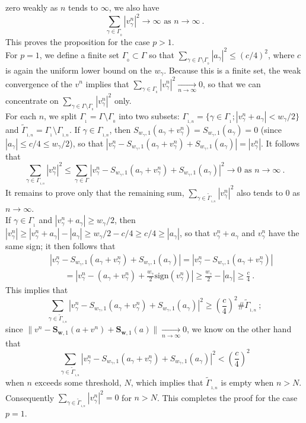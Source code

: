 \documentclass[10pt]{article}
\newcommand{\QED}{\hfill \raisebox{-2pt}{\rule{5.6pt}{8pt}\rule{4pt}{0pt}}%
  \smallskip\par}
\def\S{\mathbf{S}}
\def\ag{w_{\gamma}}
\def\g{\gamma}
\begin{document}
zero weakly as $n$ tends to $\infty$, we also have
$$
\sum_{\g \in \Gamma_{_{\!0}}} |v^n_{\g}|^2 \to \infty \mbox{ as } n \to
\infty ~.
$$
This proves the proposition for the case $p>1$. \\
For $p=1$,
we define  a finite set $\Gamma_{_{\!0}} \subset \Gamma$ so
that $\sum_{ \g \in \Gamma \setminus \Gamma_{_{\!0}}}
|a_{\g}|^2 \leq (c/4 )^2$,
where $c$ is again the uniform lower bound on the $\ag$.
Because this is a finite set, the weak convergence of the $v^n$
implies that $\sum_{\g \in \Gamma_{_{\!0}}} |v^n_{\g}|^2
\xrightarrow[n \to \infty]{~}  0$,
so that we can concentrate on
$\sum_{\g \in \Gamma \setminus \Gamma_{_{\!0}}} |v^n_{\g}|^2$ only. \\
For each $n$, we split $\Gamma_{_{\!1}}=\Gamma \setminus \Gamma_{_{\!0}}$ into
two subsets:
$\Gamma_{_{\!1,n}} = \{\g \in \Gamma_{_{\!1}};
|v^n_{\g}+a_{\g}| <\ag/2\}$ and $\widetilde{\Gamma}_{_{\!1,n}}=
\Gamma_{_{\!1}} \setminus \Gamma_{_{\!1,n}}$. If $\g \in \Gamma_{_{\!1,n}}$,
then $S_{\ag,1}(a_{\g}+v^n_{\g})=
S_{\ag,1}(a_{\g}) =0$ (since $|a_{\g}|\leq c/4 \leq \ag/2$),
so that $|v^n_{\g} -
S_{\ag,1}(a_{\g}+v^n_{\g}) + S_{\ag,1}(a_{\g})|=|v^n_{\g}|$.
It follows that
$$
\sum_{\g \in \Gamma_{_{\!1,n}}} |v^n_{\g}|^2
\leq \sum_{\g \in \Gamma} |v^n_{\g} -
S_{\ag,1}(a_{\g}+v^n_{\g}) + S_{\ag,1}(a_{\g})|^2 \to 0 \mbox{ as }
n \to \infty ~.
$$
It remains to prove only that
the remaining sum, $\sum_{\g \in \widetilde{\Gamma}_{_{\!1,n}}}
|v^n_{\g}|^2 $ also tends
to $0$ as $n \to \infty$.  \\
If $\g \in \Gamma_{_{\!1}}$ and $|v^n_{\g}+a_{\g}| \geq \ag/2$, then
$|v^n_{\g}|\geq |v^n_{\g}+a_{\g}| - |a_{\g}| \geq \ag/2 -c/4
\geq c/4 \geq |a_{\g}|$, so that $ v^n_{\g}+a_{\g}$ and
$v^n_{\g}$ have the same sign; it then follows that
\begin{eqnarray*}
&& |v^n_{\g} -
S_{\ag,1}(a_{\g}+v^n_{\g}) + S_{\ag,1}(a_{\g})|=
|v^n_{\g} -
S_{\ag,1}(a_{\g}+v^n_{\g})| \\
&&~~~~~~~~
=|v^n_{\g}- (a_{\g}+v^n_{\g})+ \frac{\ag}{2} \mbox{sign}(v^n_{\g})|
\geq  \frac{\ag}{2} -|a_{\g}| \geq \frac{c}{4} ~.
\end{eqnarray*}
This implies that
$$
\sum_{\g \in \widetilde{\Gamma}_{_{\!1,n}}}|v^n_{\g} -
S_{\ag,1}(a_{\g}+v^n_{\g}) + S_{\ag,1}(a_{\g})|^2
\geq \left(\frac{c}{4}\right)^2 \# \widetilde{\Gamma}_{_{\!1,n}} ~;
$$
since $\|v^n-\S_{\mathbf{w},1}(a+v^n)+\S_{\mathbf{w},1}(a)\|
\xrightarrow[n \to \infty]{~} 0$, we know on the other hand
that
$$
\sum_{\g \in \widetilde{\Gamma}_{_{\!1,n}}}|v^n_{\g} -
S_{\ag,1}(a_{\g}+v^n_{\g}) + S_{\ag,1}(a_{\g})|^2 <
\left(\frac{c}{4}\right)^2
$$
when $n$ exceeds some threshold, $N$, which implies that
$\widetilde{\Gamma}_{_{\!1,n}}$ is empty when $n > N$. Consequently
$\sum_{\g \in \widetilde{\Gamma}_{_{\!1,n}}}|v^n_{\g}|^2 =0$
for $n > N$. This completes the proof for the case $p=1$.\hfill \QED
\end{document}
